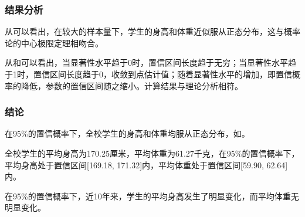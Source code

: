 \subsubsection{结果分析}

从可以看出，在较大的样本量下，学生的身高和体重近似服从正态分布，这与概率论的中心极限定理相吻合。

从和可以看出，当显著性水平趋于0时，置信区间长度趋于无穷；当显著性水平趋于1时，置信区间长度趋于0，收敛到点估计值；随着显著性水平的增加，即置信概率的降低，参数的置信区间随之缩小。计算结果与理论分析相符。

\subsubsection{结论}

在95\%的置信概率下，全校学生的身高和体重均服从正态分布，如。

全校学生的平均身高为170.25厘米，平均体重为61.27千克，在95\%的置信概率下，平均身高处于置信区间[169.18, 171.32]内，平均体重处于置信区间[59.90, 62.64]内。

在95\%的置信概率下，近10年来，学生的平均身高发生了明显变化，而平均体重无明显变化。
